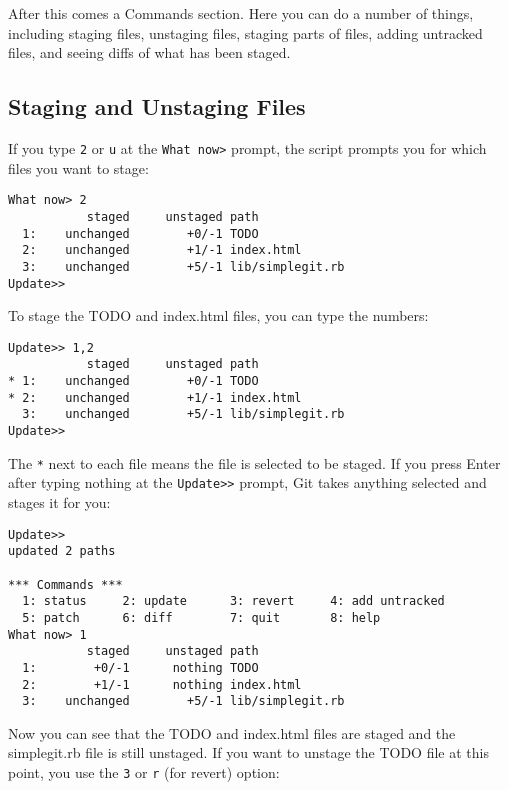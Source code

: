 \documentclass[a4paper]{book}
\begin{document}
After this comes a Commands section. Here you can do a number of things, including staging files, unstaging files, staging parts of files, adding untracked files, and seeing diffs of what has been staged.

\subsection{Staging and Unstaging Files}\label{staging-and-unstaging-files}

If you type \texttt{2} or \texttt{u} at the \texttt{What now\textgreater{}} prompt, the script prompts you for which files you want to stage:

\begin{shaded}\begin{verbatim}
What now> 2
           staged     unstaged path
  1:    unchanged        +0/-1 TODO
  2:    unchanged        +1/-1 index.html
  3:    unchanged        +5/-1 lib/simplegit.rb
Update>>
\end{verbatim}\end{shaded}

To stage the TODO and index.html files, you can type the numbers:

\begin{shaded}\begin{verbatim}
Update>> 1,2
           staged     unstaged path
* 1:    unchanged        +0/-1 TODO
* 2:    unchanged        +1/-1 index.html
  3:    unchanged        +5/-1 lib/simplegit.rb
Update>>
\end{verbatim}\end{shaded}

The \texttt{*} next to each file means the file is selected to be staged. If you press Enter after typing nothing at the \texttt{Update\textgreater{}\textgreater{}} prompt, Git takes anything selected and stages it for you:

\begin{shaded}\begin{verbatim}
Update>>
updated 2 paths

*** Commands ***
  1: status     2: update      3: revert     4: add untracked
  5: patch      6: diff        7: quit       8: help
What now> 1
           staged     unstaged path
  1:        +0/-1      nothing TODO
  2:        +1/-1      nothing index.html
  3:    unchanged        +5/-1 lib/simplegit.rb
\end{verbatim}\end{shaded}

Now you can see that the TODO and index.html files are staged and the simplegit.rb file is still unstaged. If you want to unstage the TODO file at this point, you use the \texttt{3} or \texttt{r} (for revert) option:
\end{document}
